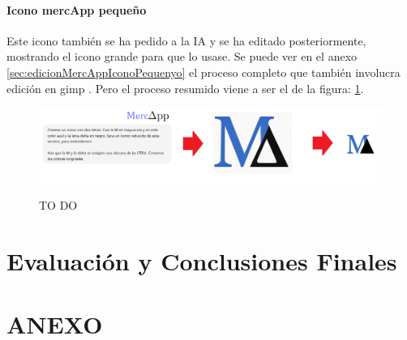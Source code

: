 \documentclass[a4paper,12pt]{report}
\begin{document}
	
	\subsubsection{Icono mercApp pequeño}
	\label{sec:iconoMercappPetitMEMORIAPPAL}
	Este icono también se ha pedido a la IA y se ha editado posteriormente, mostrando el icono grande para que lo usase. Se puede ver en el anexo \ref{sec:edicionMercAppIconoPequenyo} el proceso completo que también involucra edición en gimp . Pero el proceso resumido viene a ser el de la figura: \ref{fig:mercappResumit}.
		
		
	\FloatBarrier
	\setlength{\belowcaptionskip}{3pt}
	\begin{figure}[H]
		\centering
		\caption{TO DO}
		\includegraphics[width=1\linewidth]{img/mercappResumit}
		\label{fig:mercappResumit}
	\end{figure}
	\FloatBarrier
		
	\chapter{Evaluación y Conclusiones Finales} %
	

	
	
	
	

	
	
	
	
	
	
	
	
	
	
	
	
	
	
	
	
	
	
	
	
	
	
	
	
	
	
	
	
	
	
	
	
	
	
	
	
	
	
	
	
	\chapter{ANEXO}
	\label{chap:anexo} %
		
\end{document}
